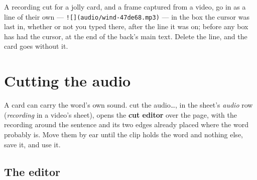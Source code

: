 \documentclass[11pt,oneside]{report}
\newcommand{\menu}[1]{\textsf{#1}}
\begin{document}
A recording cut for a jolly card, and a frame captured from a video, go in
as a line of their own --- \texttt{![](audio/wind-47de68.mp3)} --- in the
box the cursor was last in, whether or not you typed there, after the line
it was on; before any box has had the cursor, at the end of the back's main
text. Delete the line, and the card
goes without it.

\section{Cutting the audio}
\label{sec:cutaudio}

A card can carry the word's own sound. \menu{cut the audio\ldots}, in the
sheet's \emph{audio} row (\emph{recording} in a video's sheet), opens the
\textbf{cut editor} over the page, with the
recording around the sentence and its two edges already placed where the
word probably is. Move them by ear until the clip holds the word and nothing
else, save it, and use it.

\subsection*{The editor}
\end{document}
